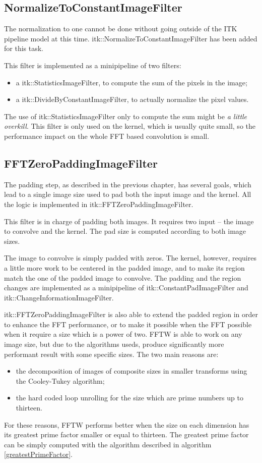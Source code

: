 \documentclass{InsightArticle}
\begin{document}
\subsection{NormalizeToConstantImageFilter}

The normalization to one cannot be done without going outside of the ITK pipeline model at this time.
itk::NormalizeToConstantImageFilter has been added for this task.

This filter is implemented as a minipipeline of two filters:
\begin{itemize}
  \item a itk::StatisticsImageFilter, to compute the sum of the pixels in the image;
  \item a itk::DivideByConstantImageFilter, to actually normalize the pixel values.
\end{itemize}
The use of itk::StatisticsImageFilter only to compute the sum might be {\em a little overkill}. This filter
is only used on the kernel, which is usually quite small, so the performance impact on the whole
FFT based convolution is small.

\subsection{FFTZeroPaddingImageFilter}

The padding step, as described in the previous chapter, has several goals, which lead to a single
image size used to pad both the input image and the kernel.
All the logic is implemented in itk::FFTZeroPaddingImageFilter.

This filter is in charge of padding both images. It requires two input -- the image to convolve and
the kernel. The pad size is computed according to both image sizes.

The image to convolve is simply padded with zeros. The kernel, however, requires a little more work to be
centered in the padded image, and to make its region match the one of the padded image to convolve.
The padding and the region changes are implemented as a minipipeline of itk::ConstantPadImageFilter and
itk::ChangeInformationImageFilter.

itk::FFTZeroPaddingImageFilter is also able to extend the padded region in order to enhance the FFT
performance, or to make it possible when the FFT possible when it require a size which is a power of
two. FFTW is able to work on any image size, but due to the algorithms useds, produce significantly
more performant result with some specific sizes. The two main reasons are:
\begin{itemize}
  \item the decomposition of images of composite sizes in smaller transforms using the
  Cooley-Tukey algorithm;
  \item the hard coded loop unrolling for the size which are prime numbers up to thirteen.
\end{itemize}
For these reasons, FFTW performs better when the size on each dimension has its greatest prime
factor smaller or equal to thirteen.
The greatest prime factor can be simply computed with the algorithm described in algorithm \ref{greatestPrimeFactor}.
\end{document}
